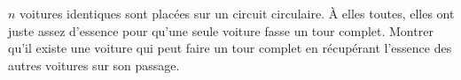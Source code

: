 $n$ voitures identiques sont placées sur un circuit circulaire. À elles toutes, elles ont juste assez d'essence pour qu'une seule voiture fasse un tour complet. Montrer qu'il existe une voiture qui peut faire un tour complet en récupérant l'essence des autres voitures sur son passage.
